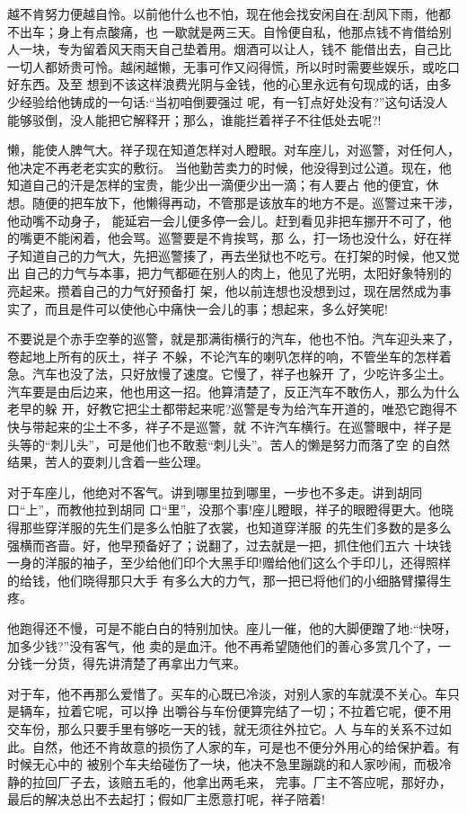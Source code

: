 \documentclass[11pt,a4paper,onecolumn]{article}
\begin{document}
越不肯努力便越自怜。以前他什么也不怕，现在他会找安闲自在:刮风下雨，他都不出车；身上有点酸痛，也
一歇就是两三天。自怜便自私，他那点钱不肯借给别人一块，专为留着风天雨天自己垫着用。烟酒可以让人，钱不
能借出去，自己比一切人都娇贵可怜。越闲越懒，无事可作又闷得慌，所以时时需要些娱乐，或吃口好东西。及至
想到不该这样浪费光阴与金钱，他的心里永远有句现成的话，由多少经验给他铸成的一句话:``当初咱倒要强过
呢，有一钉点好处没有?''这句话没人能够驳倒，没人能把它解释开；那么，谁能拦着祥子不往低处去呢?!

懒，能使人脾气大。祥子现在知道怎样对人瞪眼。对车座儿，对巡警，对任何人，他决定不再老老实实的敷衍。
当他勤苦卖力的时候，他没得到过公道。现在，他知道自己的汗是怎样的宝贵，能少出一滴便少出一滴；有人要占
他的便宜，休想。随便的把车放下，他懒得再动，不管那是该放车的地方不是。巡警过来干涉，他动嘴不动身子，
能延宕一会儿便多停一会儿。赶到看见非把车挪开不可了，他的嘴更不能闲着，他会骂。巡警要是不肯挨骂，那
么，打一场也没什么，好在祥子知道自己的力气大，先把巡警揍了，再去坐狱也不吃亏。在打架的时候，他又觉出
自己的力气与本事，把力气都砸在别人的肉上，他见了光明，太阳好象特别的亮起来。攒着自己的力气好预备打
架，他以前连想也没想到过，现在居然成为事实了，而且是件可以使他心中痛快一会儿的事；想起来，多么好笑呢!

不要说是个赤手空拳的巡警，就是那满街横行的汽车，他也不怕。汽车迎头来了，卷起地上所有的灰土，祥子
不躲，不论汽车的喇叭怎样的响，不管坐车的怎样着急。汽车也没了法，只好放慢了速度。它慢了，祥子也躲开
了，少吃许多尘土。汽车要是由后边来，他也用这一招。他算清楚了，反正汽车不敢伤人，那么为什么老早的躲
开，好教它把尘土都带起来呢?巡警是专为给汽车开道的，唯恐它跑得不快与带起来的尘土不多，祥子不是巡警，就
不许汽车横行。在巡警眼中，祥子是头等的``刺儿头''，可是他们也不敢惹``刺儿头''。苦人的懒是努力而落了空
的自然结果，苦人的耍刺儿含着一些公理。

对于车座儿，他绝对不客气。讲到哪里拉到哪里，一步也不多走。讲到胡同口``上''，而教他拉到胡同
口``里''，没那个事!座儿瞪眼，祥子的眼瞪得更大。他晓得那些穿洋服的先生们是多么怕脏了衣裳，也知道穿洋服
的先生们\myrule 多数的\myrule 是多么强横而吝啬。好，他早预备好了；说翻了，过去就是一把，抓住他们五六
十块钱一身的洋服的袖子，至少给他们印个大黑手印!赠给他们这么个手印儿，还得照样的给钱，他们晓得那只大手
有多么大的力气，那一把已将他们的小细胳臂攥得生疼。

他跑得还不慢，可是不能白白的特别加快。座儿一催，他的大脚便蹭了地:``快呀，加多少钱?''没有客气，他
卖的是血汗。他不再希望随他们的善心多赏几个了，一分钱一分货，得先讲清楚了再拿出力气来。

对于车，他不再那么爱惜了。买车的心既已冷淡，对别人家的车就漠不关心。车只是辆车，拉着它呢，可以挣
出嚼谷与车份便算完结了一切；不拉着它呢，便不用交车份，那么只要手里有够吃一天的钱，就无须往外拉它。人
与车的关系不过如此。自然，他还不肯故意的损伤了人家的车，可是也不便分外用心的给保护着。有时候无心中的
被别个车夫给碰伤了一块，他决不急里蹦跳的和人家吵闹，而极冷静的拉回厂子去，该赔五毛的，他拿出两毛来，
完事。厂主不答应呢，那好办，最后的解决总出不去起打；假如厂主愿意打呢，祥子陪着!
\end{document}
